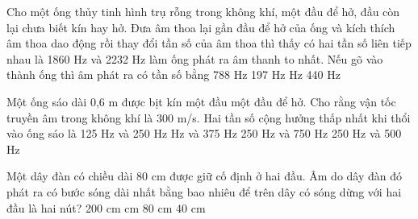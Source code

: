 \begin{ex}%
Cho một ống thủy tinh hình trụ rỗng trong không khí, một đầu để hở, đầu còn lại chưa biết kín hay hở. Đưa âm thoa lại gần đầu để hở của ống và kích thích âm thoa dao động rồi thay đổi tần số của âm thoa thì thấy có hai tần số liên tiếp nhau là 1860 Hz và 2232 Hz làm ống phát ra âm thanh to nhất. Nếu gõ vào thành ống thì âm phát ra có tần số bằng
\choice
{788 Hz}
{197 Hz}
{ Hz}
{440 Hz}
\end{ex} 
\begin{ex}%
Một ống sáo dài 0,6 m được bịt kín một đầu một đầu để hở. Cho rằng vận tốc truyền âm trong không khí là 300 m/s. Hai tần số cộng hưởng thấp nhất khi thổi vào ống sáo là
\choice
{125 Hz và 250 Hz}
{ Hz và 375 Hz}
{250 Hz và 750 Hz}
{250 Hz và 500 Hz
}
\end{ex} 

\begin{ex}%
Một dây đàn có chiều dài 80 cm được giữ cố định ở hai đầu. Âm do dây đàn đó phát ra có bước sóng dài nhất bằng bao nhiêu để trên dây có sóng dừng với hai đầu là hai nút?
\choice
{200 cm}
{ cm}
{80 cm}
{40 cm}
\end{ex} 

